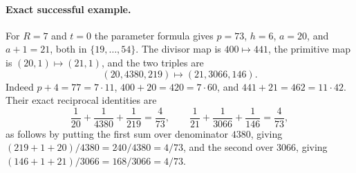 \paragraph{Exact successful example.}
For $R=7$ and $t=0$ the parameter formula gives $p=73$, $h=6$,
$a=20$, and $a+1=21$, both in $\{19,\ldots,54\}$.
The divisor map is $400\mapsto441$, the primitive map is
$(20,1)\mapsto(21,1)$, and the two triples are
\[
 (20,4380,219)\longmapsto(21,3066,146).
\]
Indeed $p+4=77=7\cdot11$,
$400+20=420=7\cdot60$, and $441+21=462=11\cdot42$.
Their exact reciprocal identities are
\[
 \frac1{20}+\frac1{4380}+\frac1{219}=\frac4{73},\qquad
 \frac1{21}+\frac1{3066}+\frac1{146}=\frac4{73},
\]
as follows by putting the first sum over denominator $4380$,
giving $(219+1+20)/4380=240/4380=4/73$, and the second over
$3066$, giving $(146+1+21)/3066=168/3066=4/73$.
